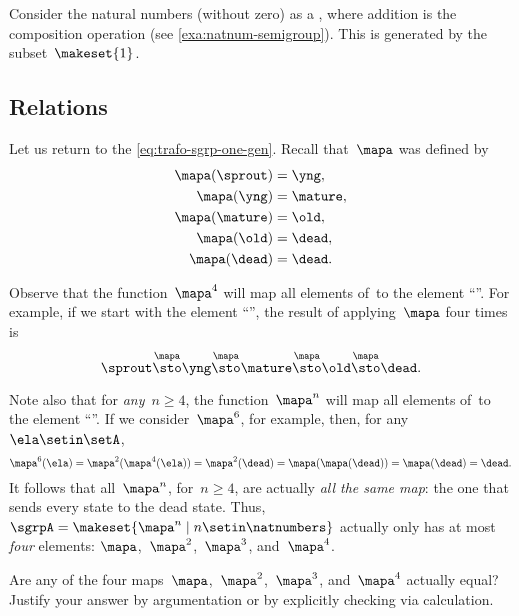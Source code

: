 \begin{example}
    Consider the natural numbers (without zero) as a , where addition is the  composition operation (see \cref{exa:natnum-semigroup}).
    This  is generated by the subset~$\makeset{1 }$.
\end{example}

\subsection{Relations}

Let us return to the  \cref{eq:trafo-sgrp-one-gen}.
Recall that~$\mapa$ was defined by
%
\begin{align}
    \mapa(\sprout) & = \yng, \\
    \mapa(\yng)    & = \mature, \\
    \mapa(\mature) & = \old, \\
    \mapa( \old)   & = \dead, \\
    \mapa(\dead)   & = \dead.
\end{align}

Observe that the function~$\mapa^4$ will map all elements of~\setA to the element ``\dead''.
For example, if we start with the element ``\sprout'', the result of applying~$\mapa$ four times is
%
\begin{equation}
    \sprout \overset{\mapa}{\sto} \yng \overset{\mapa}{\sto} \mature \overset{\mapa}{\sto} \old \overset{\mapa}{\sto} \dead.
\end{equation}

Note also that for \emph{any}~$n \geq 4$, the function~$\mapa^n$ will map all elements of~\setA to the element ``\dead''.
If we consider~$\mapa^6$, for example, then, for any~$\ela \setin \setA$,
%
\begin{equation}
    \mapa^6(\ela) = \mapa^2(\mapa^4(\ela)) = \mapa^2(\dead) = \mapa(\mapa(\dead)) = \mapa(\dead) = \dead.
\end{equation}
%
It follows that all~$\mapa^n$, for~$n \geq 4$, are actually \emph{all the same map}: the one that sends every state to the dead state.
Thus, ~$\sgrpA = \makeset{ \mapa^n \mid n \setin \natnumbers }$ actually only has at most \emph{four} elements: $\mapa$,~$\mapa^2$,~$\mapa^3$, and~$\mapa^4$.

\begin{gradedexercise}
    \label{ex:CheckRelations}
    Are any of the four maps~$\mapa$,~$\mapa^2$,~$\mapa^3$, and~$\mapa^4$ actually equal?
    Justify your answer by argumentation or by explicitly checking via calculation.
\end{gradedexercise}

